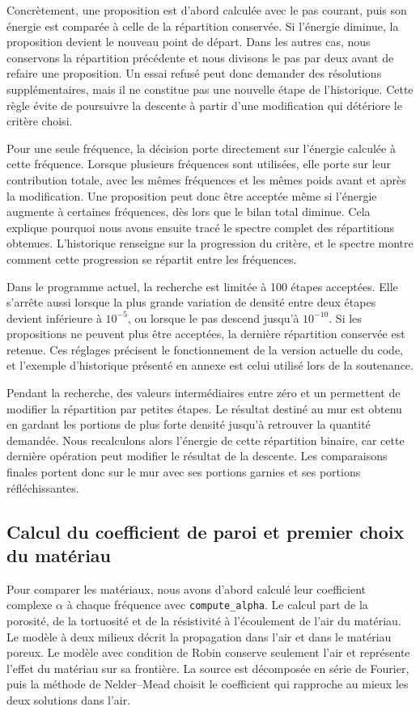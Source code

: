 \documentclass[11pt,a4paper]{article}
\newcommand{\code}[1]{\begingroup\def\UrlBreaks{\do\_\do\/\do\.}\nolinkurl{#1}\endgroup}
\begin{document}
Concrètement, une proposition est d'abord calculée avec le pas courant, puis son énergie est comparée à celle de la répartition conservée. Si l'énergie diminue, la proposition devient le nouveau point de départ. Dans les autres cas, nous conservons la répartition précédente et nous divisons le pas par deux avant de refaire une proposition. Un essai refusé peut donc demander des résolutions supplémentaires, mais il ne constitue pas une nouvelle étape de l'historique. Cette règle évite de poursuivre la descente à partir d'une modification qui détériore le critère choisi.

Pour une seule fréquence, la décision porte directement sur l'énergie calculée à cette fréquence. Lorsque plusieurs fréquences sont utilisées, elle porte sur leur contribution totale, avec les mêmes fréquences et les mêmes poids avant et après la modification. Une proposition peut donc être acceptée même si l'énergie augmente à certaines fréquences, dès lors que le bilan total diminue. Cela explique pourquoi nous avons ensuite tracé le spectre complet des répartitions obtenues. L'historique renseigne sur la progression du critère, et le spectre montre comment cette progression se répartit entre les fréquences.

Dans le programme actuel, la recherche est limitée à 100 étapes acceptées. Elle s'arrête aussi lorsque la plus grande variation de densité entre deux étapes devient inférieure à $10^{-5}$, ou lorsque le pas descend jusqu'à $10^{-10}$. Si les propositions ne peuvent plus être acceptées, la dernière répartition conservée est retenue. Ces réglages précisent le fonctionnement de la version actuelle du code, et l'exemple d'historique présenté en annexe est celui utilisé lors de la soutenance.

Pendant la recherche, des valeurs intermédiaires entre zéro et un permettent de modifier la répartition par petites étapes. Le résultat destiné au mur est obtenu en gardant les portions de plus forte densité jusqu'à retrouver la quantité demandée. Nous recalculons alors l'énergie de cette répartition binaire, car cette dernière opération peut modifier le résultat de la descente. Les comparaisons finales portent donc sur le mur avec ses portions garnies et ses portions réfléchissantes.

\subsection{Calcul du coefficient de paroi et premier choix du matériau}
Pour comparer les matériaux, nous avons d'abord calculé leur coefficient complexe $\alpha$ à chaque fréquence avec \code{compute_alpha}. Le calcul part de la porosité, de la tortuosité et de la résistivité à l'écoulement de l'air du matériau. Le modèle à deux milieux décrit la propagation dans l'air et dans le matériau poreux. Le modèle avec condition de Robin conserve seulement l'air et représente l'effet du matériau sur sa frontière. La source est décomposée en série de Fourier, puis la méthode de Nelder--Mead choisit le coefficient qui rapproche au mieux les deux solutions dans l'air.
\end{document}

